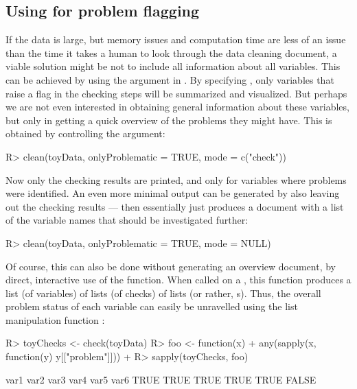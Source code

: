\documentclass[article,shortnames]{jss}
\begin{document}
\subsection[Using dataMaid for problem flagging]{Using  for problem flagging}
If the data is large, but memory issues and computation time are less
of an issue than the time it takes a human to look through the data
cleaning document, a viable solution might be not to include all
information about all variables. %
This can be achieved by using the  argument in
. By specifying , only
variables that raise a flag in the checking steps will be summarized
and visualized. But perhaps we are not even interested in obtaining
general information about these variables, but only in getting a quick
overview of the problems they might have. This is obtained by
controlling the  argument:

\begin{Schunk}
\begin{Sinput}
R> clean(toyData, onlyProblematic = TRUE, mode = c("check"))
\end{Sinput}
\end{Schunk}

Now only the checking results are printed, and only for variables
where problems were identified. An even more minimal output can be
generated by also leaving out the checking results --- then
 essentially just produces a document with a list of the variable names
that should be investigated further:

\begin{Schunk}
\begin{Sinput}
R> clean(toyData, onlyProblematic = TRUE, mode = NULL)
\end{Sinput}
\end{Schunk}

Of course, this can also be done without generating an overview
document, by direct, interactive use of the  function. When
called on a , this function produces a list (of
variables) of lists (of checks) of lists (or rather,
s). Thus, the overall problem status of each variable
can easily be unravelled using the list manipulation function
:

\begin{Schunk}
\begin{Sinput}
R> toyChecks <- check(toyData)
R> foo <- function(x) {
+    any(sapply(x, function(y) y[["problem"]]))
+  }
R> sapply(toyChecks, foo)
\end{Sinput}
\begin{Soutput}
 var1  var2  var3  var4  var5  var6 
 TRUE  TRUE  TRUE  TRUE  TRUE FALSE 
\end{Soutput}
\end{Schunk}
\end{document}
